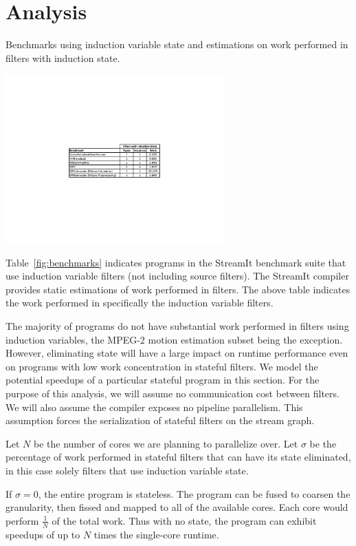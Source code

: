 \section{Analysis}
\label{sec:analysis}

\begin{table}[t]
\caption{Benchmarks using induction variable state and estimations on work performed in filters with induction state.\protect\label{fig:benchmarks}}
\includegraphics[width=3.3in]{figures/induction-benchmarks.pdf}
\end{table}

Table~\ref{fig:benchmarks} indicates programs in the StreamIt benchmark suite that use induction variable filters (not including source filters).  The StreamIt compiler provides static estimations of work performed in filters.  The above table indicates the work performed in specifically the induction variable filters.

The majority of programs do not have substantial work performed in filters using induction variables, the MPEG-2 motion estimation subset being the exception.  However, eliminating state will have a large impact on runtime performance even on programs with low work concentration in stateful filters.  We model the potential speedups of a particular stateful program in this section.  For the purpose of this analysis, we will assume no communication cost between filters.  We will also assume the compiler exposes no pipeline parallelism.  This assumption forces the serialization of stateful filters on the stream graph.

Let $N$ be the number of cores we are planning to parallelize over.  Let $\sigma$ be the percentage of work performed in stateful filters that can have its state eliminated, in this case solely filters that use induction variable state.  

If $\sigma = 0$, the entire program is stateless.  The program can be fused to coarsen the granularity, then fissed and mapped to all of the available cores.  Each core would perform $\frac{1}{N}$ of the total work.  Thus with no state, the program can exhibit speedups of up to $N$ times the single-core runtime.

